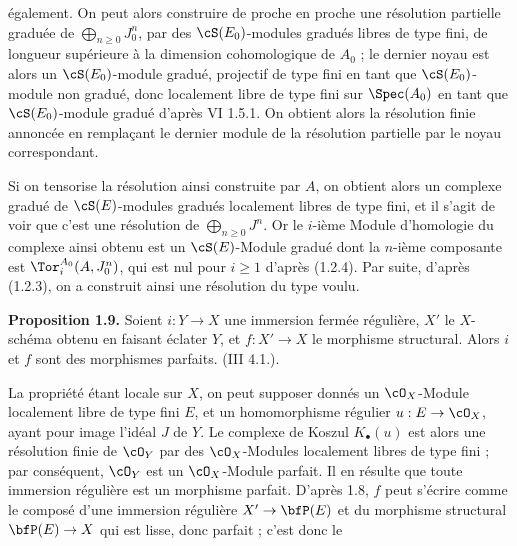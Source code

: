 également. On peut alors construire de proche en proche une résolution partielle graduée de \(\bigoplus_{n\ge0}J_0^n\), par des \(\cS(E_0)\)-modules gradués libres de type fini, de longueur supérieure à la dimension cohomologique de \(A_0\) ; le dernier noyau est alors un \(\cS(E_0)\)-module gradué, projectif de type fini en tant que \(\cS(E_0)\)-module non gradué, donc localement libre de type fini sur \(\Spec(A_0)\) en tant que \(\cS(E_0)\)-module gradué d'après VI 1.5.1. On obtient alors la résolution finie annoncée en remplaçant le dernier module de la résolution partielle par le noyau correspondant.

Si on tensorise la résolution ainsi construite par \(A\), on obtient alors un complexe gradué de \(\cS(E)\)-modules gradués localement libres de type fini, et il s'agit de voir que c'est une résolution de \(\bigoplus_{n\ge0}J^n\). Or le \(i\)-ième Module d'homologie du complexe ainsi obtenu est un \(\cS(E)\)-Module gradué dont la \(n\)-ième composante est \(\Tor_i^{A_0}(A,J_0^n)\), qui est nul pour \(i\ge1\) d'après (1.2.4). Par suite, d'après (1.2.3), on a construit ainsi une résolution du type voulu.

\textbf{Proposition 1.9.} Soient \(i:Y\to X\) une immersion fermée régulière, \(X'\) le \(X\)-schéma obtenu en faisant éclater \(Y\), et \(f:X'\to X\) le morphisme structural. Alors \(i\) et \(f\) sont des morphismes parfaits. (III 4.1.).

La propriété étant locale sur \(X\), on peut supposer donnés un \(\cO_X\)-Module localement libre de type fini \(E\), et un homomorphisme régulier \(u:E\to\cO_X\), ayant pour image l'idéal \(J\) de \(Y\). Le complexe de Koszul \(K_\bullet(u)\) est alors une résolution finie de \(\cO_Y\) par des \(\cO_X\)-Modules localement libres de type fini ; par conséquent, \(\cO_Y\) est un \(\cO_X\)-Module parfait. Il en résulte que toute immersion régulière est un morphisme parfait. D'après 1.8, \(f\) peut s'écrire comme le composé d'une immersion régulière \(X'\to\bfP(E)\) et du morphisme structural \(\bfP(E)\to X\) qui est lisse, donc parfait ; c'est donc le
